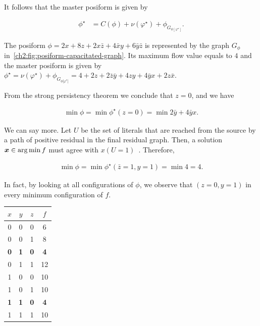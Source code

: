 It follows that the master posiform is given by

\begin{align*}
	\phi^{\star} &= C(\phi) + \nu(\varphi^{\star}) + \phi_{ G_{ \phi [ \varphi^{\star}] }}.
\end{align*}

\begin{example}
The posiform $\phi = 2x + 8z + 2x\bar{z} + 4\bar{x}y + 6\bar{y}\bar{z}$ is represented by the graph $G_{\phi}$ in~\cref{ch2:fig:posiform-capacitated-graph}. Its maximum flow value  equals to $4$ and the master posiform is given by $\phi^{\star} = \nu(\varphi ^{\star}) + \phi_{G_{\phi {[\varphi^{\star}}]}} = 4 + 2z + 2\bar{z}\bar{y} + 4zy + 4\bar{y}x + 2z\bar{x}$.
\end{example}

From the strong persistency theorem we conclude that $z=0$, and we have

\begin{align*}
	\min \phi = \min \phi^{\star}(z=0) = \min 2\bar{y} + 4\bar{y}x.
\end{align*}

We can say more. Let $U$ be the set of literals that are reached from the source by a path of positive residual in the final residual graph. Then, a solution $\bm{x} \in \operatorname*{arg\,min} f$ must agree with $x(U=1)$~\cite{boros02pseudo}. Therefore,

\begin{align*}
	\min \phi = \min \phi^{\star}(\bar{z}=1,y=1) = \min 4 = 4.
\end{align*}

In fact, by looking at all configurations of $\phi$, we observe that $(z=0,y=1)$ in every minimum configuration of $f$.

\begin{center}
\begin{tabular}{|c|c|c|c|}
\hline
$x$ & $y$ & $z$ & $f$\\
\hline
0 & 0 & 0 & 6 \\
0 & 0 & 1 & 8 \\
\textbf{0} & \textbf{1} & \textbf{0} & \textbf{4} \\
0 & 1 & 1 & 12 \\
1 & 0 & 0 & 10 \\
1 & 0 & 1 & 10 \\
\textbf{1} & \textbf{1} & \textbf{0} & \textbf{4} \\
1 & 1 & 1 & 10 \\
\hline
\end{tabular}
\end{center}

